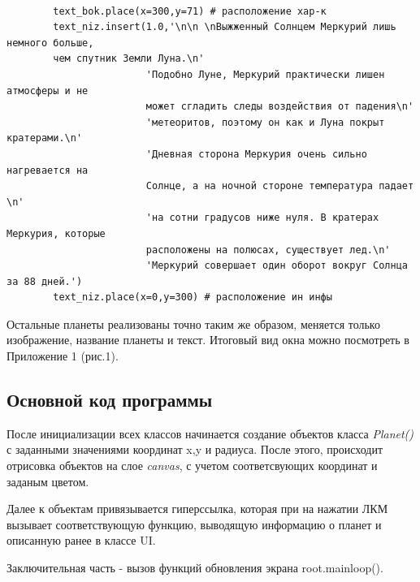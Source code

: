 \documentclass[11pt,a4paper]{report}
\begin{document}
\begin{verbatim}
        
        text_bok.place(x=300,y=71) # расположение хар-к        
        text_niz.insert(1.0,'\n\n \nВыжженный Солнцем Меркурий лишь немного больше, 
        чем спутник Земли Луна.\n'
                        'Подобно Луне, Меркурий практически лишен атмосферы и не 
                        может сгладить следы воздействия от падения\n' 
                        'метеоритов, поэтому он как и Луна покрыт кратерами.\n'
                        'Дневная сторона Меркурия очень сильно нагревается на 
                        Солнце, а на ночной стороне температура падает \n'
                        'на сотни градусов ниже нуля. В кратерах Меркурия, которые 
                        расположены на полюсах, существует лед.\n'
                        'Меркурий совершает один оборот вокруг Солнца за 88 дней.')
        text_niz.place(x=0,y=300) # расположение ин инфы
\end{verbatim}

Остальные планеты реализованы точно таким же образом, меняется только изображение, название планеты и текст.
Итоговый вид окна можно посмотреть в Приложение 1 (рис.1).
\subsection{Основной код программы}
После инициализации всех классов начинается создание объектов класса \textit{Planet()} с заданными значениями координат x,y и радиуса.
После этого, происходит отрисовка объектов на слое  \textit{canvas}, с  учетом соответсвующих координат и заданым цветом. 

Далее к объектам привязывается гиперссылка, которая при на нажатии ЛКМ вызывает соответствующую функцию, выводящую информацию о планет и  описанную ранее в классе UI.  





Заключительная часть - вызов функций обновления экрана root.mainloop().












\newpage
\end{document}
